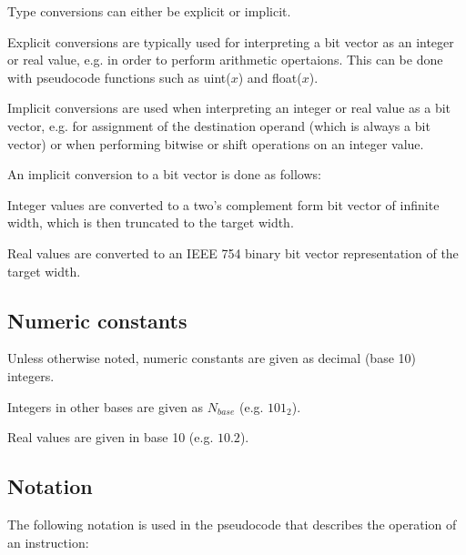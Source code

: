 Type conversions can either be explicit or implicit.

Explicit conversions are typically used for interpreting a bit vector as an
integer or real value, e.g. in order to perform arithmetic opertaions. This can
be done with pseudocode functions such as uint($x$) and float($x$).

Implicit conversions are used when interpreting an integer or real value as a
bit vector, e.g. for assignment of the destination operand (which is always a
bit vector) or when performing bitwise or shift operations on an integer value.

An implicit conversion to a bit vector is done as follows:

\begin{bulletitems}
  \item Integer values are converted to a two's complement form bit vector of
        infinite width, which is then truncated to the target width.
  \item Real values are converted to an IEEE 754 binary bit vector
        representation of the target width.
\end{bulletitems}

\subsection{Numeric constants}

Unless otherwise noted, numeric constants are given as decimal (base 10)
integers.

Integers in other bases are given as $N_{base}$ (e.g. $101_{2}$).

Real values are given in base 10 (e.g. $10.2$).

\subsection{Notation}

The following notation is used in the pseudocode that describes the operation
of an instruction:

